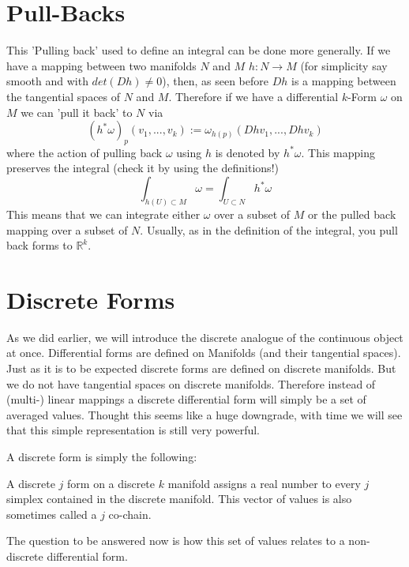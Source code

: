 
\section{Pull-Backs}
This 'Pulling back' used to define an integral can be done more generally. If we have a mapping between two manifolds $N$ and $M$ $h: N\to M$ (for simplicity say smooth and with $det(Dh) \neq 0$), then, as seen before $Dh$ is a mapping between the tangential spaces of $N$ and $M$. Therefore if we have a differential $k$-Form $\omega$ on $M$ we can 'pull it back' to $N$ via
\[(h^*\omega)_p (v_1,...,v_k) := \omega_{h(p)}(Dh v_1,...,Dh v_k) \]
 where the action of pulling back $\omega$ using $h$ is denoted by $h^* \omega$. This mapping preserves the integral (check it by using the definitions!)
\[\int_{h(U)\subset M} \omega = \int_{U \subset N} h^*\omega \]
This means that we can integrate either $\omega$ over a subset of $M$ or the pulled back mapping over a subset of $N$. Usually, as in the definition of the integral, you pull back forms to $\mathbb R^k$.


\section{Discrete Forms}
As we did earlier, we will introduce the discrete analogue of the continuous object at once. Differential forms are defined on Manifolds (and their tangential spaces). Just as it is to be expected discrete forms are defined on discrete manifolds. But we do not have tangential spaces on discrete manifolds. Therefore instead of (multi-) linear mappings a discrete differential form will simply be a set of averaged values. Thought this seems like a huge downgrade, with time we will see that this simple representation is still very powerful.

A discrete form is simply the following:
\begin{definition}
A discrete $j$ form on a discrete $k$ manifold assigns a real number to every $j$ simplex contained in the discrete manifold.  This vector of values is also sometimes called a $j$ co-chain. 
\end{definition}
The question to be answered now is how this set of values relates to a non-discrete differential form.

